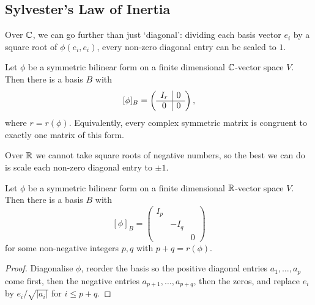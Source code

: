 \documentclass[a4paper]{scrartcl}
\begin{document}
\subsection{Sylvester's Law of Inertia}

Over $\mathbb{C}$, we can go further than just `diagonal': dividing each basis vector $e_i$ by a square root of $\phi(e_i, e_i)$, every non-zero diagonal entry can be scaled to $1$.

\begin{corollary}
    Let $\phi$ be a symmetric bilinear form on a finite dimensional $\mathbb{C}$-vector space $V$. Then there is a basis $B$ with
    $$
    [\phi]_B = \left(\begin{array}{ c | c }
        I_r & 0 \\
        \hline
        0 & 0
      \end{array}\right),
    $$
    where $r = r(\phi)$. Equivalently, every complex symmetric matrix is congruent to exactly one matrix of this form.
\end{corollary}

Over $\mathbb{R}$ we cannot take square roots of negative numbers, so the best we can do is scale each non-zero diagonal entry to $\pm 1$.

\begin{corollary}
    Let $\phi$ be a symmetric bilinear form on a finite dimensional $\mathbb{R}$-vector space $V$. Then there is a basis $B$ with
    $$
    [\phi]_B = \begin{pmatrix}
        I_p & & \\
        & -I_q & \\
        & & 0
    \end{pmatrix}
    $$
    for some non-negative integers $p, q$ with $p + q = r(\phi)$.
\end{corollary}
\begin{proof}
    Diagonalise $\phi$, reorder the basis so the positive diagonal entries $a_1, \dots, a_p$ come first, then the negative entries $a_{p + 1}, \dots, a_{p+q}$, then the zeros, and replace $e_i$ by $e_i / \sqrt{|a_i|}$ for $i \leq p + q$.
\end{proof}
\end{document}
